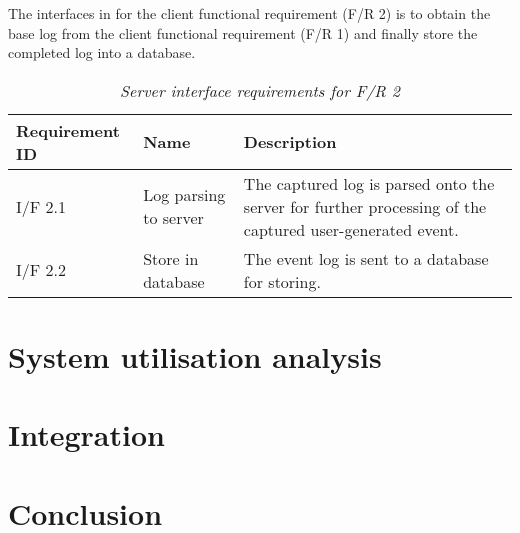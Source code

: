 The interfaces in  for the client functional requirement (F/R 2) is to obtain the base log from the client functional requirement (F/R 1) and finally store the completed log into a database.

\begin{table}[!htb]
	\centering
	\small
	\caption[Server interface requirements]
	{\textit{Server interface requirements for F/R 2}}
	\label{tbl:Ch2_Server_Interface_Requirements}
	\begin{tabularx}{\textwidth}{|l|l|X|}
		\hline \textbf{Requirement ID} & \textbf{Name} & \textbf{Description} \\
		\hline I/F 2.1 & Log parsing to server & The captured log is parsed onto the server for further processing of the captured user-generated event.\\
		\hline I/F 2.2 & Store in database & The event log is sent to a database for storing.\\
		\hline
	\end{tabularx}
\end{table}

\clearpage

\section{System utilisation analysis}\label{ch2:system_utilisation_analysis}

\section{Integration}

\section{Conclusion}